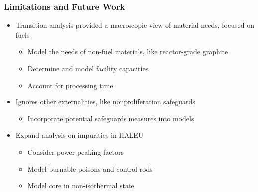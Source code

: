 \begin{frame}
      \frametitle{Limitations and Future Work}
      \begin{itemize}
            \item Transition analysis provided a macroscopic view of 
                  material needs, focused on fuels
            \begin{itemize}
                  \item<2-> Model the needs of non-fuel materials, 
                        like reactor-grade graphite
                  \item<2-> Determine and model facility capacities
                  \item<2-> Account for processing time 
            \end{itemize}
            \item<3-> Ignores other externalities, like nonproliferation
                    safeguards
            \begin{itemize}
                  \item<4-> Incorporate potential safeguards measures into models
            \end{itemize}
            \item<5-> Expand analysis on impurities in \gls{HALEU}
            \begin{itemize}
                  \item<6-> Consider power-peaking factors
                  \item<6-> Model burnable poisons and control rods 
                  \item<6-> Model core in non-isothermal state
            \end{itemize}
      \end{itemize} 
\end{frame}